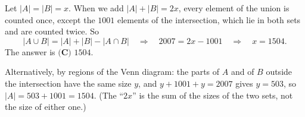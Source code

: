 Let $|A|=|B|=x$. When we add $|A|+|B|=2x$, every element of the union is counted once, except the $1001$ elements of the intersection, which lie in both sets and are counted twice. So
\[
|A\cup B|=|A|+|B|-|A\cap B|\quad\Longrightarrow\quad2007=2x-1001\quad\Longrightarrow\quad x=1504 .
\]
The answer is $\boxed{\textbf{(C) }1504}$.

Alternatively, by regions of the Venn diagram: the parts of $A$ and of $B$ outside the intersection have the same size $y$, and $y+1001+y=2007$ gives $y=503$, so $|A|=503+1001=1504$. (The ``$2x$'' is the sum of the sizes of the two sets, not the size of either one.)
